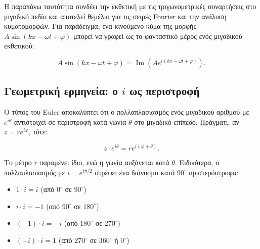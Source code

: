\documentclass[a4paper, 11pt]{article}
\providecommand{\tightlist}{\setlength{\itemsep}{0pt}\setlength{\parskip}{0pt}}
\begin{document}
Η παραπάνω ταυτότητα συνδέει την εκθετική με τις τριγωνομετρικές
συναρτήσεις στο μιγαδικό πεδίο και αποτελεί θεμέλιο για τις σειρές
Fourier και την ανάλυση κυματομορφών. Για παράδειγμα, ένα κινούμενο κύμα
της μορφής \(A\sin(kx - \omega t + \varphi)\) μπορεί να γραφεί ως το
φανταστικό μέρος ενός μιγαδικού εκθετικού:

\[
A\sin(kx - \omega t + \varphi) = \operatorname{Im}\left( A e^{i(kx - \omega t + \varphi)} \right).
\]

\subsection{\texorpdfstring{Γεωμετρική ερμηνεία: ο \(i\) ως
περιστροφή}{Γεωμετρική ερμηνεία: ο i ως περιστροφή}}\label{ux3b3ux3b5ux3c9ux3bcux3b5ux3c4ux3c1ux3b9ux3baux3ae-ux3b5ux3c1ux3bcux3b7ux3bdux3b5ux3afux3b1-ux3bf-i-ux3c9ux3c2-ux3c0ux3b5ux3c1ux3b9ux3c3ux3c4ux3c1ux3bfux3c6ux3ae}

Ο τύπος του Euler αποκαλύπτει ότι ο πολλαπλασιασμός ενός μιγαδικού
αριθμού με \(e^{i\theta}\) αντιστοιχεί σε περιστροφή κατά γωνία
\(\theta\) στο μιγαδικό επίπεδο. Πράγματι, αν \(z = r e^{i\varphi}\),
τότε:

\[
z \cdot e^{i\theta} = r e^{i(\varphi + \theta)}.
\]

Το μέτρο \(r\) παραμένει ίδιο, ενώ η γωνία αυξάνεται κατά \(\theta\).
Ειδικότερα, ο πολλαπλασιασμός με \(i = e^{i\pi/2}\) στρέφει ένα διάνυσμα
κατά \(90^\circ\) αριστερόστροφα:

\begin{itemize}
\tightlist
\item
  \(1 \cdot i = i\) (από \(0^\circ\) σε \(90^\circ\))
\item
  \(i \cdot i = -1\) (από \(90^\circ\) σε \(180^\circ\))
\item
  \((-1) \cdot i = -i\) (από \(180^\circ\) σε \(270^\circ\))
\item
  \((-i) \cdot i = 1\) (από \(270^\circ\) σε \(360^\circ\) ή
  \(0^\circ\))
\end{itemize}
\end{document}
